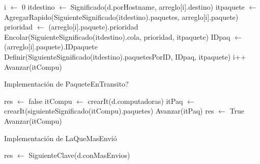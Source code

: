 \begin{Algoritmos}
\begin{algorithm}
\begin{algorithmic}[0]
	\State {}
	\State i $\gets$ 0
	 	
			\State itdestino $\gets$ Significado(d.porHostname, arreglo[i].destino) 
			\State itpaquete $\gets$ AgregarRapido(SiguienteSignificado(itdestino).paquetes, arreglo[i].paquete) 
			\State {}
			\State prioridad $\gets$ (arreglo[i].paquete).prioridad
			\State Encolar(SiguienteSignificado(itdestino).cola, prioridad, itpaquete) 
			\State IDpaq $\gets$ (arreglo[i].paquete).IDpaquete 		
			\State Definir(SiguienteSignificado(itdestino).paquetesPorID, IDpaq, itpaquete) 
		\EndIf
	\State i++
	\State Avanzar(itCompu)
	\EndWhile
	
\EndFunction
\end{algorithmic}
\end{algorithm}

\begin{algorithm}
\caption{Implementaci\'on de PaqueteEnTransito?}
\begin{algorithmic}[0]
	\State res $\gets$ false 
	\State itCompu $\gets$ crearIt(d.computadoras) 
		\newline  {}
		\State itPaq $\gets$ crearIt(siguienteSignificado(itCompu).paquetes) 
			\State Avanzar(itPaq)  
		\EndWhile
		 
			\State res $\gets$ True 
		\EndIf
		\State Avanzar(itCompu) 
	\EndWhile
\EndFunction
\end{algorithmic}
\end{algorithm}

\begin{algorithm}
\caption{Implementaci\'on de LaQueMasEnvi\'o}
\begin{algorithmic}[0]
	\State res $\gets$ SiguienteClave(d.conMasEnvios)	
\EndFunction
\end{algorithmic}
\end{algorithm}




\end{Algoritmos}
